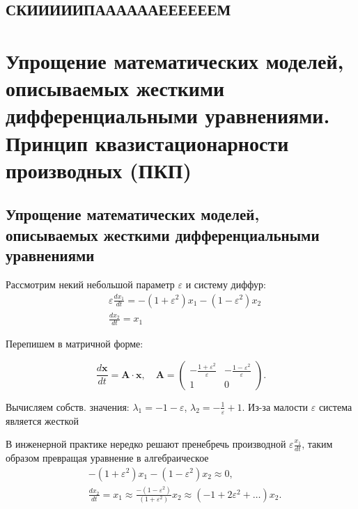	\subsection{СКИИИИИПААААААЕЕЕЕЕЕМ}
	
	\newpage
	
	\section{Упрощение математических моделей, описываемых жесткими дифференциальными уравнениями. Принцип квазистационарности производных (ПКП)}
	
	\subsection{Упрощение математических моделей, описываемых жесткими дифференциальными уравнениями}
	
	Рассмотрим некий небольшой параметр $\varepsilon$ и систему диффур:
	\vspace{-0.7em}
	\begin{align}
		&\varepsilon \frac{dx_1}{dt} = -\left(1 + \varepsilon^2\right)x_1 - \left(1 - \varepsilon^2\right)x_2 \\
		&\frac{dx_2}{dt} = x_1
	\end{align}
	
	Перепишем в матричной форме:
	
	\begin{equation}
		\frac{d\mathbf{x}}{dt} = \mathbf{A} \cdot \mathbf{x}, \quad
		\mathbf{A} = 
		\begin{pmatrix}
			-\frac{1 + \varepsilon^2}{\varepsilon} & -\frac{1 - \varepsilon^2}{\varepsilon} \\
			1 & 0
		\end{pmatrix}.
	\end{equation}
	
	Вычисляем собств. значения: $\lambda_1 = -1 - \varepsilon$, $\lambda_2 = - \frac 1 \varepsilon + 1$. Из-за малости $\varepsilon$ система является жесткой
	
	В инженерной практике нередко решают пренебречь производной $\varepsilon \frac {x_1}{dt}$, таким образом превращая уравнение в алгебраическое
	\vspace{-0.85em}
	\begin{align}
		&-(1+\varepsilon^2)x_1 - (1-\varepsilon^2)x_2 \approx 0, \\
		&\frac{dx_2}{dt} = x_1 \approx \frac{-(1-\varepsilon^2)}{(1+\varepsilon^2)}x_2 \approx (-1 + 2\varepsilon^2 + \dots)x_2.
	\end{align}
	
